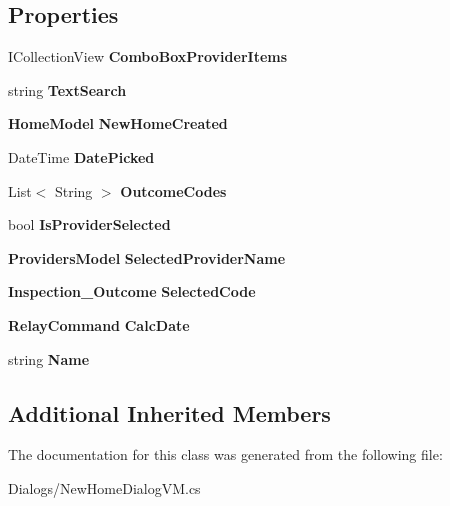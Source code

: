 \subsection*{Properties}
\begin{DoxyCompactItemize}
\item 
\mbox{\label{class_a_f_h___scheduler_1_1_dialogs_1_1_new_home_dialog_v_m_a2329b75007f774afbab46b4d789e47b3}} 
I\+Collection\+View {\bfseries Combo\+Box\+Provider\+Items}\hspace{0.3cm}{\ttfamily  [get]}
\item 
\mbox{\label{class_a_f_h___scheduler_1_1_dialogs_1_1_new_home_dialog_v_m_a36b82980a5d0a7d5bb6174dd38a67fc2}} 
string {\bfseries Text\+Search}\hspace{0.3cm}{\ttfamily  [get, set]}
\item 
\mbox{\label{class_a_f_h___scheduler_1_1_dialogs_1_1_new_home_dialog_v_m_adc83bd603e27b70b272769cab4908b4a}} 
\textbf{ Home\+Model} {\bfseries New\+Home\+Created}\hspace{0.3cm}{\ttfamily  [get, set]}
\item 
\mbox{\label{class_a_f_h___scheduler_1_1_dialogs_1_1_new_home_dialog_v_m_a1f9c4619b3221d74da772d0843848e20}} 
Date\+Time {\bfseries Date\+Picked}\hspace{0.3cm}{\ttfamily  [get, set]}
\item 
\mbox{\label{class_a_f_h___scheduler_1_1_dialogs_1_1_new_home_dialog_v_m_ac9f74d14c18d8b1168984209c472e246}} 
List$<$ String $>$ {\bfseries Outcome\+Codes}\hspace{0.3cm}{\ttfamily  [get, set]}
\item 
\mbox{\label{class_a_f_h___scheduler_1_1_dialogs_1_1_new_home_dialog_v_m_a17a2cc9920e8737bd98d1abc280550c9}} 
bool {\bfseries Is\+Provider\+Selected}\hspace{0.3cm}{\ttfamily  [get, set]}
\item 
\mbox{\label{class_a_f_h___scheduler_1_1_dialogs_1_1_new_home_dialog_v_m_ae7175516dd2d0732aff6971597d49e45}} 
\textbf{ Providers\+Model} {\bfseries Selected\+Provider\+Name}\hspace{0.3cm}{\ttfamily  [get, set]}
\item 
\mbox{\label{class_a_f_h___scheduler_1_1_dialogs_1_1_new_home_dialog_v_m_a998b703fe243b8092d444bc57eff11cd}} 
\textbf{ Inspection\+\_\+\+Outcome} {\bfseries Selected\+Code}\hspace{0.3cm}{\ttfamily  [get, set]}
\item 
\mbox{\label{class_a_f_h___scheduler_1_1_dialogs_1_1_new_home_dialog_v_m_a0ae5e7769a1fae3da5fa3455234ca12d}} 
\textbf{ Relay\+Command} {\bfseries Calc\+Date}\hspace{0.3cm}{\ttfamily  [get]}
\item 
\mbox{\label{class_a_f_h___scheduler_1_1_dialogs_1_1_new_home_dialog_v_m_ad8ac437446ba53d02cf838a9b6da4ce0}} 
string {\bfseries Name}\hspace{0.3cm}{\ttfamily  [get]}
\end{DoxyCompactItemize}
\subsection*{Additional Inherited Members}


The documentation for this class was generated from the following file\+:\begin{DoxyCompactItemize}
\item 
Dialogs/New\+Home\+Dialog\+V\+M.\+cs\end{DoxyCompactItemize}
